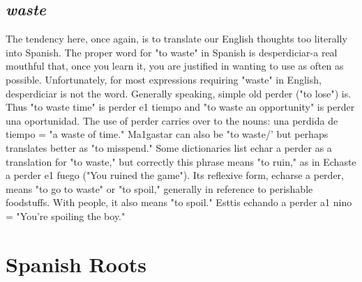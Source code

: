 \documentclass[14pt,a4paper,oneside]{memoir}
\begin{document}
{{{{\section{\emph{waste}}

The tendency here, once again, is to translate our English
thoughts too literally into Spanish. The proper word for "to waste" in
Spanish is desperdiciar-a real mouthful that, once you learn it, you
are justified in wanting to use as often as possible. Unfortunately, for
most expressions requiring "waste" in English, desperdiciar is not the
word. Generally speaking, simple old perder ("to lose") is. Thus "to
waste time" is perder e1 tiempo and "to waste an opportunity" is perder una oportunidad. The use of perder carries over to the nouns: una
perdida de tiempo = "a waste of time." Ma1gastar can also be "to
waste/' but perhaps translates better as "to misspend." Some dictionaries list echar a perder as a translation for "to waste," but correctly
this phrase means "to ruin," as in Echaste a perder e1 fuego ("You ruined the game"). Its reflexive form, echarse a perder, means "to go to
waste" or "to spoil," generally in reference to perishable foodstuffs.
With people, it also means "to spoil." Esttis echando a perder a1 nino
= "You're spoiling the boy."

\chapter{Spanish Roots}

}}}}
\end{document}
